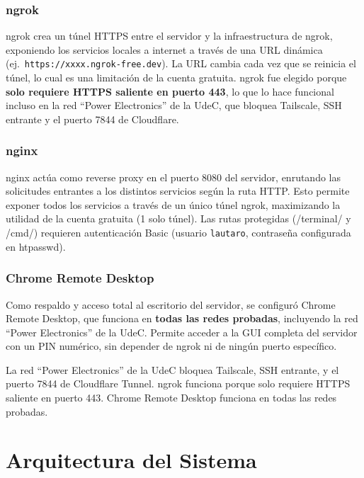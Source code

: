 \documentclass[12pt,a4paper]{article}
\begin{document}
\subsubsection{ngrok}

ngrok crea un t\'unel HTTPS entre el servidor y la infraestructura de ngrok, exponiendo los servicios locales a internet a trav\'es de una URL din\'amica (ej.\ \texttt{https://xxxx.ngrok-free.dev}). La URL cambia cada vez que se reinicia el t\'unel, lo cual es una limitaci\'on de la cuenta gratuita. ngrok fue elegido porque \textbf{solo requiere HTTPS saliente en puerto 443}, lo que lo hace funcional incluso en la red ``Power Electronics'' de la UdeC, que bloquea Tailscale, SSH entrante y el puerto 7844 de Cloudflare.

\subsubsection{nginx}

nginx act\'ua como reverse proxy en el puerto 8080 del servidor, enrutando las solicitudes entrantes a los distintos servicios seg\'un la ruta HTTP. Esto permite exponer todos los servicios a trav\'es de un \'unico t\'unel ngrok, maximizando la utilidad de la cuenta gratuita (1 solo t\'unel). Las rutas protegidas (/terminal/ y /cmd/) requieren autenticaci\'on Basic (usuario \texttt{lautaro}, contrase\~na configurada en htpasswd).

\subsubsection{Chrome Remote Desktop}

Como respaldo y acceso total al escritorio del servidor, se configur\'o Chrome Remote Desktop, que funciona en \textbf{todas las redes probadas}, incluyendo la red ``Power Electronics'' de la UdeC. Permite acceder a la GUI completa del servidor con un PIN num\'erico, sin depender de ngrok ni de ning\'un puerto espec\'ifico.

\begin{notebox}
La red ``Power Electronics'' de la UdeC bloquea Tailscale, SSH entrante, y el puerto 7844 de Cloudflare Tunnel. ngrok funciona porque solo requiere HTTPS saliente en puerto 443. Chrome Remote Desktop funciona en todas las redes probadas.
\end{notebox}

\section{Arquitectura del Sistema}
\end{document}
